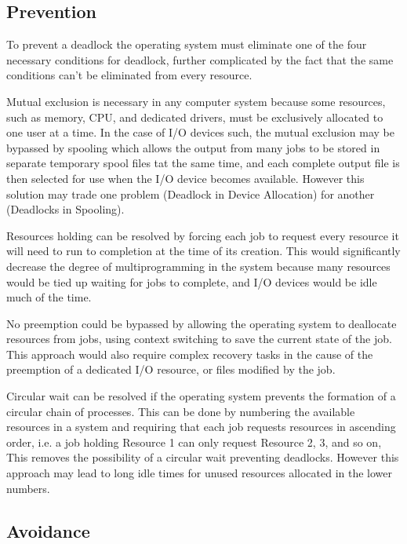 \documentclass[12pt letter]{report}
\begin{document}
\subsection{Prevention}

To prevent a deadlock the operating system must eliminate one of the
four necessary conditions for deadlock, further complicated by the
fact that the same conditions can't be eliminated from every resource.


Mutual exclusion is necessary in any computer system because some
resources, such as memory, CPU, and dedicated drivers, must be
exclusively allocated to one user at a time. In the case of I/O
devices such, the mutual exclusion may be bypassed by spooling which
allows the output from many jobs to be stored in separate temporary
spool files tat the same time, and each complete output file is then
selected for use when the I/O device becomes available. However this
solution may trade one problem (Deadlock in Device Allocation) for
another (Deadlocks in Spooling).

Resources holding can be resolved by forcing each job to request
every resource it will need to run to completion at the time of its creation.
This would significantly decrease the degree of multiprogramming in the system
because many resources would be tied up waiting for jobs to complete,
and I/O devices would be idle much of the time.

No preemption could be bypassed by allowing the operating system to
deallocate resources from jobs, using context switching to save the
current state of the job. This approach would also require complex
recovery tasks in the cause of the preemption of a dedicated I/O
resource, or files modified by the job.

Circular wait can be resolved if the operating system prevents the
formation of a circular chain of processes. This can be done by
numbering the available resources
in a system and requiring that each job requests resources in
ascending order, i.e. a job holding Resource 1 can only request
Resource 2, 3, and so on, This removes the possibility of a circular
wait preventing deadlocks. However this approach may lead to long
idle times for unused resources allocated in the lower numbers.

\subsection{Avoidance}
\end{document}
